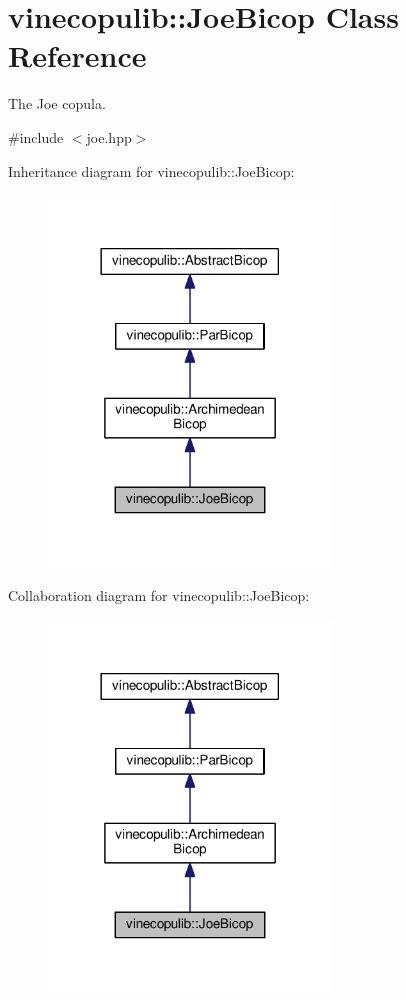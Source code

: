 \hypertarget{classvinecopulib_1_1_joe_bicop}{}\section{vinecopulib\+:\+:Joe\+Bicop Class Reference}
\label{classvinecopulib_1_1_joe_bicop}


The Joe copula.  




{\ttfamily \#include $<$joe.\+hpp$>$}



Inheritance diagram for vinecopulib\+:\+:Joe\+Bicop\+:\nopagebreak
\begin{figure}[H]
\begin{center}
\leavevmode
\includegraphics[width=213pt]{classvinecopulib_1_1_joe_bicop__inherit__graph}
\end{center}
\end{figure}


Collaboration diagram for vinecopulib\+:\+:Joe\+Bicop\+:\nopagebreak
\begin{figure}[H]
\begin{center}
\leavevmode
\includegraphics[width=213pt]{classvinecopulib_1_1_joe_bicop__coll__graph}
\end{center}
\end{figure}
